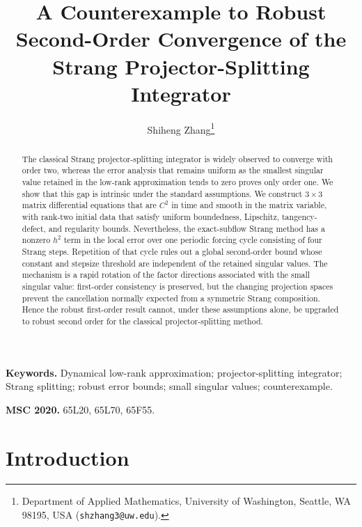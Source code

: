 \documentclass[]{article}
\numberwithin{equation}{section}
\theoremstyle{plain}
\theoremstyle{remark}
\begin{document}
\title{A Counterexample to Robust Second-Order Convergence of the Strang
Projector-Splitting Integrator}
\author{Shiheng Zhang\thanks{Department of Applied Mathematics,
University of Washington, Seattle, WA 98195, USA
(\texttt{shzhang3@uw.edu}).}}
\date{}

\maketitle

\begin{abstract}
The classical Strang projector-splitting integrator is widely observed
to converge with order two, whereas the error analysis that remains
uniform as the smallest singular value retained in the low-rank
approximation tends to zero proves only order one.  We show that this
gap is intrinsic under the standard assumptions.  We construct
$3\times3$ matrix differential equations that are $C^2$ in time and
smooth in the matrix variable, with rank-two initial data
that satisfy uniform boundedness, Lipschitz, tangency-defect, and
regularity bounds.  Nevertheless, the exact-subflow Strang method has
a nonzero $h^2$ term in the local error over one periodic forcing cycle
consisting of four Strang steps.  Repetition of that cycle rules out a
global second-order bound
whose constant and stepsize threshold are independent of the retained
singular values.  The mechanism is a rapid rotation of the factor
directions associated with the small singular value: first-order
consistency is preserved, but the changing projection spaces prevent
the cancellation normally expected from a symmetric Strang
composition.  Hence the robust first-order result cannot, under these
assumptions alone, be upgraded to robust second order for the classical
projector-splitting method.
\end{abstract}

\medskip
\noindent\textbf{Keywords.}
Dynamical low-rank approximation; projector-splitting integrator;
Strang splitting; robust error bounds; small singular values;
counterexample.

\smallskip
\noindent\textbf{MSC 2020.} 65L20, 65L70, 65F55.

\section{Introduction}
\label{sec:introduction}
\end{document}
